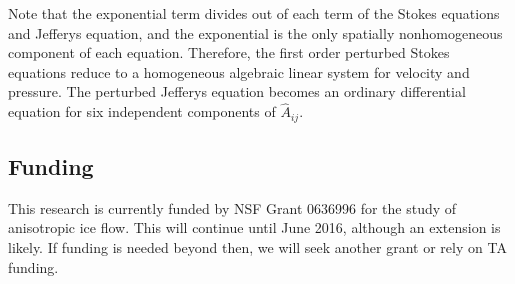 \documentclass{report}
\begin{document}
Note that the exponential term divides out of each term of the Stokes equations and Jefferys equation, and the exponential is the only spatially nonhomogeneous component of each equation.  Therefore, the first order perturbed Stokes equations reduce to a homogeneous algebraic linear system for velocity and pressure. The perturbed Jefferys equation becomes an ordinary differential equation for six independent components of $\hat{A}_{ij}$.




\subsection{Funding}
This research is currently funded by NSF Grant 0636996 for the study of anisotropic ice flow. This will continue until June 2016, although an extension is likely. If funding is needed beyond then, we will seek another grant or rely on TA funding. 



\end{document}

